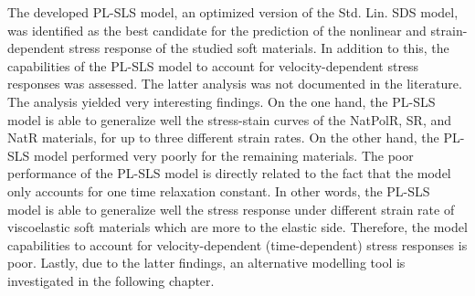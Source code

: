 The developed PL-SLS model, an optimized version of the Std. Lin. SDS model, was identified as the best candidate for the prediction of the nonlinear and strain-dependent stress response of the studied soft materials. In addition to this, the capabilities of the PL-SLS model to account for velocity-dependent stress responses was assessed. The latter analysis was not documented in the literature. The analysis yielded very interesting findings. On the one hand, the PL-SLS model is able to generalize well the stress-stain curves of the NatPolR, SR, and NatR materials, for up to three different strain rates. On the other hand, the PL-SLS model performed very poorly for the remaining materials. The poor performance of the PL-SLS model is directly related to the fact that the model only accounts for one time relaxation constant. In other words, the PL-SLS model is able to generalize well the stress response under different strain rate of viscoelastic soft materials which are more to the elastic side. Therefore, the model capabilities to account for velocity-dependent (time-dependent) stress responses is poor. Lastly, due to the latter findings, an alternative modelling tool is investigated in the following chapter.